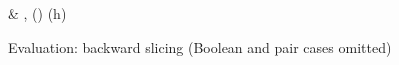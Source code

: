 \begin{figure}[H]
\vspace{5pt}
\flushleft{}
\begin{salign}
   &\closeDefsFwd
   \bigjoin\rho,
   () \join (\bigjoin h)
\end{salign}
\caption{Evaluation: backward slicing (Boolean and pair cases omitted)}
\end{figure}
